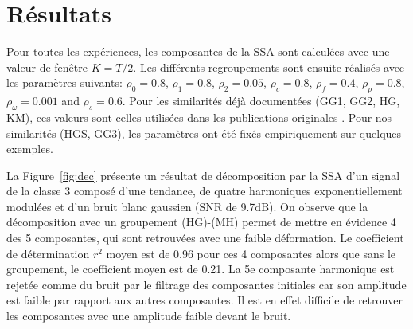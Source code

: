 \documentclass{gretsi}
\newcommand{\set}[1]{\left \{ 1, \dots, #1 \right \}}
\begin{document}


    
       
\vspace{-.4cm}
\section{Résultats}
\label{sec:res}
\vspace{-.2cm}


Pour toutes les expériences, les composantes de la SSA sont calculées avec une valeur de fenêtre $K=T/2$.
Les différents regroupements sont ensuite réalisés avec les paramètres suivants: $\rho_0=0.8$, $\rho_1=0.8$, $\rho_2=0.05$, $\rho_c=0.8$, $\rho_f=0.4$, $\rho_p=0.8$, $\rho_\omega=0.001$ and $\rho_s=0.6$.
Pour les similarités déjà documentées (GG1, GG2, HG, KM), ces valeurs sont celles utilisées dans les publications originales \cite{abalov_14_auto, alvarez_13_auto}. Pour nos similarités (HGS, GG3), les paramètres ont été fixés empiriquement sur quelques exemples.


La Figure~\ref{fig:dec} présente un résultat de décomposition par la SSA d'un signal de la classe 3 composé d'une tendance, de quatre harmoniques exponentiellement modulées et d'un bruit blanc gaussien (SNR de 9.7dB).
On observe que la décomposition  avec un groupement (HG)-(MH) permet de mettre en évidence 4 des 5 composantes, qui sont retrouvées avec une faible déformation. 
Le coefficient de détermination $r^2$ moyen est de 0.96 pour ces 4 composantes alors que sans le groupement, le coefficient moyen est de 0.21.
La 5e composante harmonique est rejetée comme du bruit par le filtrage des composantes initiales car son amplitude est faible par rapport aux autres composantes.
Il est en effet difficile de retrouver les composantes avec une amplitude faible devant le bruit.
\end{document}
